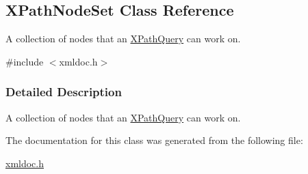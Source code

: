 \hypertarget{classXPathNodeSet}{
\subsection{XPathNodeSet Class Reference}
\label{classXPathNodeSet}
}


A collection of nodes that an \hyperlink{classXPathQuery}{XPathQuery} can work on.  




{\ttfamily \#include $<$xmldoc.h$>$}



\subsubsection{Detailed Description}
A collection of nodes that an \hyperlink{classXPathQuery}{XPathQuery} can work on. 

The documentation for this class was generated from the following file:\begin{DoxyCompactItemize}
\item 
\hyperlink{xmldoc_8h}{xmldoc.h}\end{DoxyCompactItemize}
